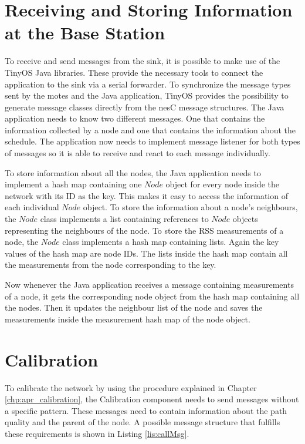 \section{Receiving and Storing Information at the Base Station}
\label{chp:imp_baseStation}
To receive and send messages from the sink, it is possible to make use of the TinyOS Java libraries. These provide the necessary tools to connect the application to the sink via a serial forwarder. To synchronize the message types sent by the motes and the Java application, TinyOS provides the possibility to generate message classes directly from the nesC message structures. The Java application needs to know two different messages. One that contains the information collected by a node and one that contains the information about the schedule. The application now needs to implement message listener for both types of messages so it is able to receive and react to each message individually.

To store information about all the nodes, the Java application needs to implement a hash map containing one $Node$ object for every node inside the network with its ID as the key. This makes it easy to access the information of each individual $Node$ object. To store the information about a node's neighbours, the $Node$ class implements a list containing references to $Node$ objects representing the neighbours of the node. To store the RSS measurements of a node, the $Node$ class implements a hash map containing lists. Again the key values of the hash map are node IDs. The lists inside the hash map contain all the measurements from the node corresponding to the key. 

Now whenever the Java application receives a message containing measurements of a node, it gets the corresponding node object from the hash map containing all the nodes. Then it updates the neighbour list of the node and saves the measurements inside the measurement hash map of the node object.
\section{Calibration}
\label{chp:imp_calibration}
To calibrate the network by using the procedure explained in Chapter \ref{chp:apr_calibration}, the Calibration component needs to send messages without a specific pattern. These messages need to contain information about the path quality and the parent of the node. A possible message structure that fulfills these requirements is shown in Listing \ref{lis:callMsg}. 

